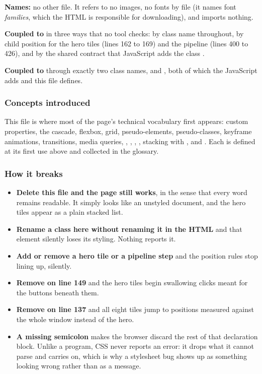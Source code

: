 \textbf{Names:} no other file. It refers to no images, no fonts by file (it names
font \emph{families}, which the HTML is responsible for downloading), and imports
nothing.

\textbf{Coupled to } in three ways that no tool checks: by class
name throughout, by child position for the hero tiles (lines 162 to 169) and the
pipeline (lines 400 to 426), and by the shared contract that JavaScript adds the
class .

\textbf{Coupled to } through exactly two class names,
 and , both of which the JavaScript adds and this file
defines.

\subsubsection*{Concepts introduced}

This file is where most of the page's technical vocabulary first appears: custom
properties, the cascade, flexbox, grid, pseudo-elements, pseudo-classes, keyframe
animations, transitions, media queries, , ,
, , stacking with , and
. Each is defined at its first use above and collected
in the glossary.

\subsubsection*{How it breaks}

\begin{itemize}
\item \textbf{Delete this file and the page still works}, in the sense that every
  word remains readable. It simply looks like an unstyled document, and the hero
  tiles appear as a plain stacked list.
\item \textbf{Rename a class here without renaming it in the HTML} and that
  element silently loses its styling. Nothing reports it.
\item \textbf{Add or remove a hero tile or a pipeline step} and the position rules
  stop lining up, silently.
\item \textbf{Remove  on line 149} and the hero tiles
  begin swallowing clicks meant for the buttons beneath them.
\item \textbf{Remove  on line 137} and all eight tiles
  jump to positions measured against the whole window instead of the hero.
\item \textbf{A missing semicolon} makes the browser discard the rest of that
  declaration block. Unlike a program, CSS never reports an error: it drops what it
  cannot parse and carries on, which is why a stylesheet bug shows up as something
  looking wrong rather than as a message.
\end{itemize}

